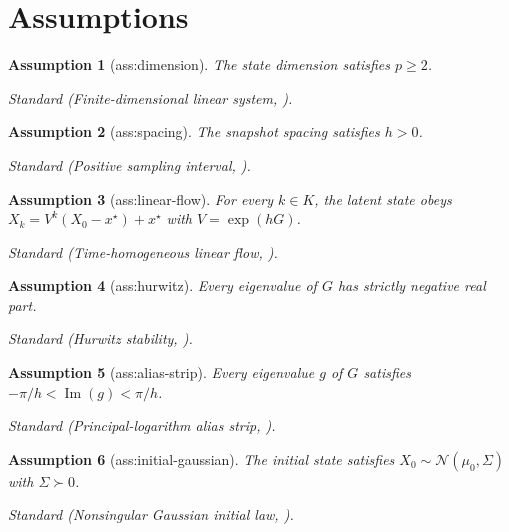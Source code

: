 \documentclass{article}
\newtheorem{assumption}{Assumption}
\begin{document}
\section{Assumptions}

\begin{assumption}[ass:dimension]\label{ass:dimension}
The state dimension satisfies \(p\ge 2\).
\par\smallskip\noindent\emph{Standard} (Finite-dimensional linear system, \cite{AaltoLamolineGoncalves2022}).
\end{assumption}

\begin{assumption}[ass:spacing]\label{ass:spacing}
The snapshot spacing satisfies \(h>0\).
\par\smallskip\noindent\emph{Standard} (Positive sampling interval, \cite{Blevins2017}).
\end{assumption}

\begin{assumption}[ass:linear-flow]\label{ass:linear-flow}
For every \(k\in K\), the latent state obeys \(X_k=V^k(X_0-x^\star)+x^\star\) with \(V=\exp(hG)\).
\par\smallskip\noindent\emph{Standard} (Time-homogeneous linear flow, \cite{WangEtAl2024}).
\end{assumption}

\begin{assumption}[ass:hurwitz]\label{ass:hurwitz}
Every eigenvalue of \(G\) has strictly negative real part.
\par\smallskip\noindent\emph{Standard} (Hurwitz stability, \cite{Blevins2017}).
\end{assumption}

\begin{assumption}[ass:alias-strip]\label{ass:alias-strip}
Every eigenvalue \(g\) of \(G\) satisfies \( -\pi/h<\operatorname{Im}(g)<\pi/h\).
\par\smallskip\noindent\emph{Standard} (Principal-logarithm alias strip, \cite{Blevins2017}).
\end{assumption}

\begin{assumption}[ass:initial-gaussian]\label{ass:initial-gaussian}
The initial state satisfies \(X_0\sim\mathcal N(\mu_0,\Sigma)\) with \(\Sigma\succ0\).
\par\smallskip\noindent\emph{Standard} (Nonsingular Gaussian initial law, \cite{AaltoLamolineGoncalves2022}).
\end{assumption}
\end{document}

